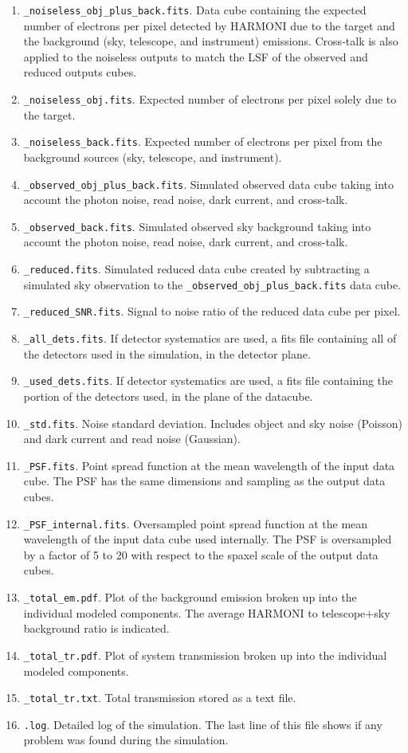 \documentclass[12pt]{report}
\begin{document}
\begin{enumerate}
\setlength\itemsep{-0.5ex}
\item \texttt{\_noiseless\_obj\_plus\_back.fits}. Data cube containing the expected number of electrons per pixel detected by HARMONI due to the target and the background (sky, telescope, and instrument) emissions. Cross-talk is also applied to the noiseless outputs to match the LSF of the observed and reduced outputs cubes.
\item \texttt{\_noiseless\_obj.fits}. Expected number of electrons per pixel solely due to the target.
\item \texttt{\_noiseless\_back.fits}. Expected number of electrons per pixel from the background sources (sky, telescope, and instrument).
\item \texttt{\_observed\_obj\_plus\_back.fits}. Simulated observed data cube taking into account the photon noise, read noise, dark current, and cross-talk.
\item \texttt{\_observed\_back.fits}. Simulated observed sky background taking into account the photon noise, read noise, dark current, and cross-talk.
\item \texttt{\_reduced.fits}. Simulated reduced data cube created by subtracting a simulated sky observation  to the \texttt{\_observed\_obj\_plus\_back.fits} data cube.
\item \texttt{\_reduced\_SNR.fits}. Signal to noise ratio of the reduced data cube per pixel.
\item \texttt{\_all\_dets.fits}. If detector systematics are used, a fits file containing all of the detectors used in the simulation, in the detector plane.
\item \texttt{\_used\_dets.fits}. If detector systematics are used, a fits file containing the portion of the detectors used, in the plane of the datacube.
\item \texttt{\_std.fits}. Noise standard deviation. Includes object and sky noise (Poisson) and dark current and read noise (Gaussian).
\item \texttt{\_PSF.fits}. Point spread function at the mean wavelength of the input data cube. The PSF has the same dimensions and sampling as the output data cubes.
\item \texttt{\_PSF\_internal.fits}. Oversampled point spread function at the mean wavelength of the input data cube used internally. The PSF is oversampled by a factor of 5 to 20 with respect to the spaxel scale of the output data cubes.
\item \texttt{\_total\_em.pdf}. Plot of the background emission broken up into the individual modeled components. The average HARMONI to telescope$+$sky background ratio is indicated.
\item \texttt{\_total\_tr.pdf}. Plot of system transmission broken up into the individual modeled components.
\item \texttt{\_total\_tr.txt}. Total transmission stored as a text file.
\item \texttt{.log}. Detailed log of the simulation. The last line of this file shows if any problem was found during the simulation.
\end{enumerate}
\end{document}
